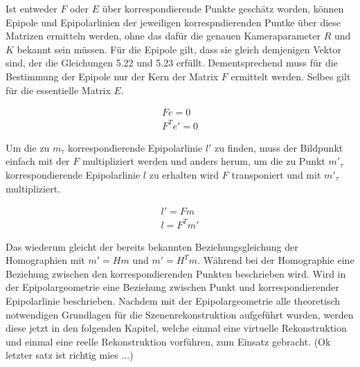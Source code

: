 
%

Ist entweder $F$ oder $E$ über korrespondierende Punkte geschätz worden, können Epipole und Epipolarlinien der jeweiligen korrespndierenden Puntke über diese Matrizen ermitteln werden, ohne das dafür die genauen Kameraparameter $R$ und $K$ bekannt sein müssen\cite{HZ,Elements,ZZGXr}. Für die Epipole gilt, dass sie gleich demjenigen Vektor sind, der die Gleichungen 5.22 und 5.23 erfüllt. Dementsprechend muss für die Bestimmung der Epipole nur der Kern der Matrix $F$ ermittelt werden. Selbes gilt für die essentielle Matrix $E$\cite{HZ,Elements,ZZGXr}.

\begin{gather}
	Fe = 0\\
	F^Te' = 0
\end{gather}

Um die zu $m_\tau$ korrespondierende Epipolarlinie $l'$ zu finden, muss der Bildpunkt einfach mit der $F$ multipliziert werden und anders herum, um die zu Punkt $m'_{\tau}$ korrespondierende Epipolarlinie $l$ zu erhalten wird $F$ transponiert und mit $m'_{\tau}$ multipliziert\cite{HZ,Elements}.

\begin{gather}
	l' = Fm\\
	l = F^Tm'
\end{gather} 

Das wiederum gleicht der bereits bekannten Beziehungsgleichung der Homographien mit $m' = Hm$ und $m' = H^Tm$. Während bei der Homographie eine Beziehung zwischen den korrespondierenden Punkten beschrieben wird. Wird in der Epipolargeometrie eine Beziehung zwischen Punkt und korrespondierender Epipolarlinie beschrieben. Nachdem mit der Epipolargeometrie alle theoretisch notwendigen Grundlagen für die Szenenrekonstruktion aufgeführt wurden, werden diese jetzt in den folgenden Kapitel, welche einmal eine virtuelle Rekonstruktion und einmal eine reelle Rekonstruktion vorführen, zum Einsatz gebracht. (Ok letzter satz ist richtig mies ...)


